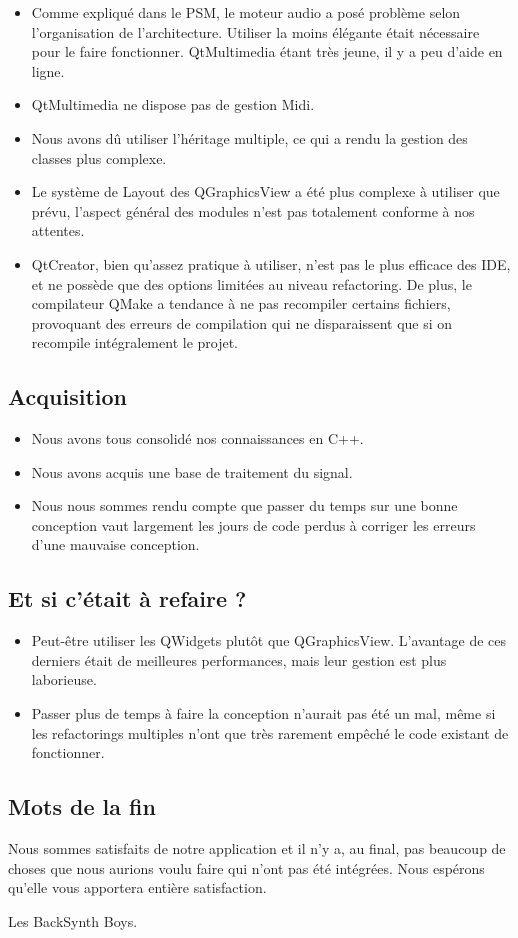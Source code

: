\begin{itemize}
\item
  Comme expliqué dans le PSM, le moteur audio a posé problème selon
  l'organisation de l'architecture. Utiliser la moins élégante était
  nécessaire pour le faire fonctionner. QtMultimedia étant très
  jeune, il y a peu d'aide en ligne.
\item
  QtMultimedia ne dispose pas de gestion Midi.
\item
  Nous avons dû utiliser l'héritage multiple, ce qui a rendu la
  gestion des classes plus complexe.
\item
  Le système de Layout des QGraphicsView a été plus complexe à
  utiliser que prévu, l'aspect général des modules n'est pas
  totalement conforme à nos attentes.
\item
  QtCreator, bien qu'assez pratique à utiliser, n'est pas le plus
  efficace des IDE, et ne possède que des options limitées au niveau
  refactoring. De plus, le compilateur QMake a tendance à ne pas
  recompiler certains fichiers, provoquant des erreurs de compilation
  qui ne disparaissent que si on recompile intégralement le projet.
\end{itemize}
\subsection{Acquisition}

\begin{itemize}
\item
  Nous avons tous consolidé nos connaissances en C++.
\item
  Nous avons acquis une base de traitement du signal.
\item
  Nous nous sommes rendu compte que passer du temps sur une bonne
  conception vaut largement les jours de code perdus à corriger les
  erreurs d'une mauvaise conception.
\end{itemize}
\subsection{Et si c'était à refaire ?}

\begin{itemize}
\item
  Peut-être utiliser les QWidgets plutôt que QGraphicsView.
  L'avantage de ces derniers était de meilleures performances, mais
  leur gestion est plus laborieuse.
\item
  Passer plus de temps à faire la conception n'aurait pas été un mal,
  même si les refactorings multiples n'ont que très rarement empêché
  le code existant de fonctionner.
\end{itemize}
\subsection{Mots de la fin}

Nous sommes satisfaits de notre application et il n'y a, au final,
pas beaucoup de choses que nous aurions voulu faire qui n'ont pas
été intégrées. Nous espérons qu'elle vous apportera entière
satisfaction.

Les BackSynth Boys.

